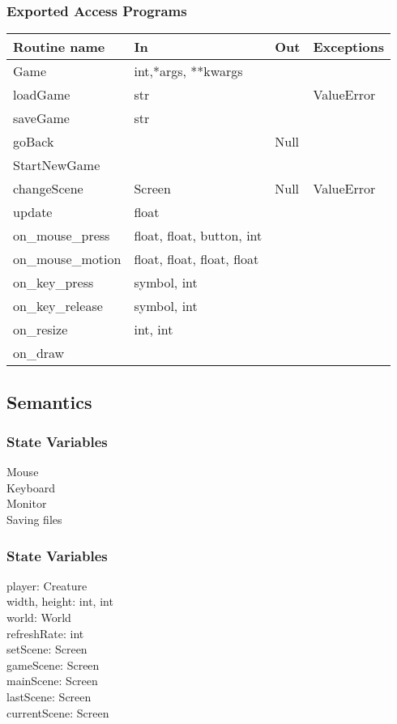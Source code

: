 \documentclass{article}
\begin{document}
\subsubsection {Exported Access Programs}
\begin{table}[!htbp]
\begin{tabular}{| l | l | l | l |}
\hline
\textbf{Routine name} & \textbf{In} & \textbf{Out} & \textbf{Exceptions}\\
\hline
Game & int,*args, **kwargs & ~ & ~\\
\hline
loadGame & str & ~ & ValueError\\
\hline
saveGame & str & ~ & ~\\
\hline
goBack & ~ & Null & ~\\
\hline
StartNewGame & ~ & ~ & ~\\
\hline
changeScene & Screen & Null & ValueError\\
\hline
update & float & ~ & ~\\
\hline
on\_mouse\_press & float, float, button, int & ~ & ~\\
\hline
on\_mouse\_motion & float, float, float, float & ~ & ~\\
\hline
on\_key\_press & symbol, int & ~ & ~\\
\hline
on\_key\_release & symbol, int & ~ & ~\\
\hline
on\_resize & int, int & ~ & ~\\
\hline
on\_draw & ~ & ~ & ~\\
\hline
\end{tabular}

\end{table}
\FloatBarrier

\subsection {Semantics}

\subsubsection {State Variables}
Mouse\\
Keyboard\\
Monitor\\
Saving files

\subsubsection {State Variables}
player: Creature\\
width, height: int, int\\
world: World\\
refreshRate: int\\
setScene: Screen\\
gameScene: Screen\\
mainScene: Screen\\
lastScene: Screen\\
currentScene: Screen
\end{document}
